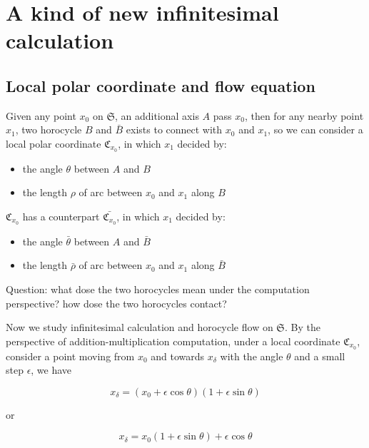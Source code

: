 \documentclass{article}
\begin{document}
\section{A kind of new infinitesimal calculation}\label{sec:akonic}

\subsection{Local polar coordinate and flow equation}\label{sec:lpcafe}

Given any point $x_0$ on $\mathfrak{S}$, an additional axis $A$ pass $x_0$, then for any nearby point $x_1$, two
horocycle $B$ and $\bar{B}$ exists to connect with $x_0$ and $x_1$, so we can consider a local polar coordinate
$\mathfrak{C}_{x_0}$, in which $x_1$ decided by:
\begin{itemize}
    \item the angle $\theta$ between $A$ and $B$
    \item the length $\rho$ of arc between $x_0$ and $x_1$ along $B$
\end{itemize}

$\mathfrak{C}_{x_0}$ has a counterpart $\bar{\mathfrak{C}_{x_0}}$, in which $x_1$ decided by:
\begin{itemize}
    \item the angle $\bar{\theta}$ between $A$ and $\bar{B}$
    \item the length $\bar{\rho}$ of arc between $x_0$ and $x_1$ along $\bar{B}$
\end{itemize}

Question: what dose the two horocycles mean under the computation perspective? how dose the two horocycles contact?

Now we study infinitesimal calculation and horocycle flow on $\mathfrak{S}$. By the perspective of
addition-multiplication computation, under a local coordinate $\mathfrak{C}_{x_0}$,
consider a point moving from $x_0$ and towards $x_{\delta}$ with the angle $\theta$ and a small step $\epsilon$, we have

\begin{equation}
    x_{\delta} = (x_0 + \epsilon \cos \theta)(1 + \epsilon \sin \theta)
\end{equation}

or

\begin{equation}
    x_{\delta} = x_0 (1 + \epsilon \sin \theta) + \epsilon \cos \theta
\end{equation}
\end{document}
